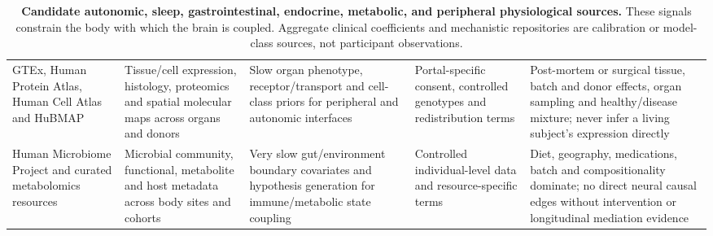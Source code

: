 \begin{table}[!h]
\begin{tabularx}{\textwidth}{@{}p{}p{}p{}p{}X@{}}
GTEx, Human Protein Atlas, Human Cell Atlas and HuBMAP &
Tissue/cell expression, histology, proteomics and spatial molecular maps
across organs and donors &
Slow organ phenotype, receptor/transport and cell-class priors for peripheral
and autonomic interfaces &
Portal-specific consent, controlled genotypes and redistribution terms &
Post-mortem or surgical tissue, batch and donor effects, organ sampling and
healthy/disease mixture; never infer a living subject's expression directly\\

Human Microbiome Project and curated metabolomics resources &
Microbial community, functional, metabolite and host metadata across body
sites and cohorts &
Very slow gut/environment boundary covariates and hypothesis generation for
immune/metabolic state coupling &
Controlled individual-level data and resource-specific terms &
Diet, geography, medications, batch and compositionality dominate; no direct
neural causal edges without intervention or longitudinal mediation evidence\\
\bottomrule
\end{tabularx}
\caption{\textbf{Candidate autonomic, sleep, gastrointestinal, endocrine,
metabolic, and peripheral physiological sources.} These signals constrain the
body with which the brain is coupled. Aggregate clinical coefficients and
mechanistic repositories are calibration or model-class sources, not
participant observations.}
\label{tab:appendix-physiology-expanded}
\end{table}

